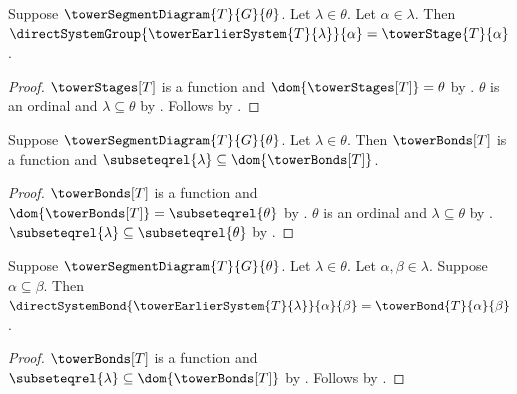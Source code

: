 \begin{proposition}\label{tower_earlier_system_group_under_diagram}
    Suppose $\towerSegmentDiagram{T}{G}{\theta}$.
    Let $\lambda\in\theta$.
    Let $\alpha\in\lambda$.
    Then $\directSystemGroup{\towerEarlierSystem{T}{\lambda}}{\alpha}=
        \towerStage{T}{\alpha}$.
\end{proposition}
\begin{proof}
    $\towerStages[T]$ is a function and
        $\dom{\towerStages[T]}=\theta$ by
        .
    $\theta$ is an ordinal and $\lambda\subseteq\theta$ by
        .
    Follows by .
\end{proof}

\begin{proposition}\label{tower_earlier_system_bond_domain_under_diagram}
    Suppose $\towerSegmentDiagram{T}{G}{\theta}$.
    Let $\lambda\in\theta$.
    Then $\towerBonds[T]$ is a function and
        $\subseteqrel{\lambda}\subseteq\dom{\towerBonds[T]}$.
\end{proposition}
\begin{proof}
    $\towerBonds[T]$ is a function and
        $\dom{\towerBonds[T]}=\subseteqrel{\theta}$ by
        .
    $\theta$ is an ordinal and $\lambda\subseteq\theta$ by
        .
    $\subseteqrel{\lambda}\subseteq\subseteqrel{\theta}$ by
        .
\end{proof}

\begin{proposition}\label{tower_earlier_system_bond_under_diagram}
    Suppose $\towerSegmentDiagram{T}{G}{\theta}$.
    Let $\lambda\in\theta$.
    Let $\alpha,\beta\in\lambda$.
    Suppose $\alpha\subseteq\beta$.
    Then $\directSystemBond{\towerEarlierSystem{T}{\lambda}}
            {\alpha}{\beta}=\towerBond{T}{\alpha}{\beta}$.
\end{proposition}
\begin{proof}
    $\towerBonds[T]$ is a function and
        $\subseteqrel{\lambda}\subseteq\dom{\towerBonds[T]}$ by
        .
    Follows by .
\end{proof}

